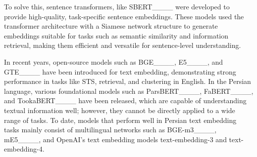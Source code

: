 To solve this, sentence transformers, like SBERT____ were developed to provide high-quality, task-specific sentence embeddings. These models used the transformer architecture with a Siamese network structure to generate embeddings suitable for tasks such as semantic similarity and information retrieval, making them efficient and versatile for sentence-level understanding.

In recent years, open-source models such as BGE____, E5____, and GTE____ have been introduced for text embedding, demonstrating strong performance in tasks like STS, retrieval, and clustering in English. In the Persian language, various foundational models such as ParsBERT____, FaBERT____, and TookaBERT____ have been released, which are capable of understanding textual information well; however, they cannot be directly applied to a wide range of tasks. To date, models that perform well in Persian text embedding tasks mainly consist of multilingual networks such as BGE-m3____, mE5____, and OpenAI's text embedding models text-embedding-3 and text-embedding-4.